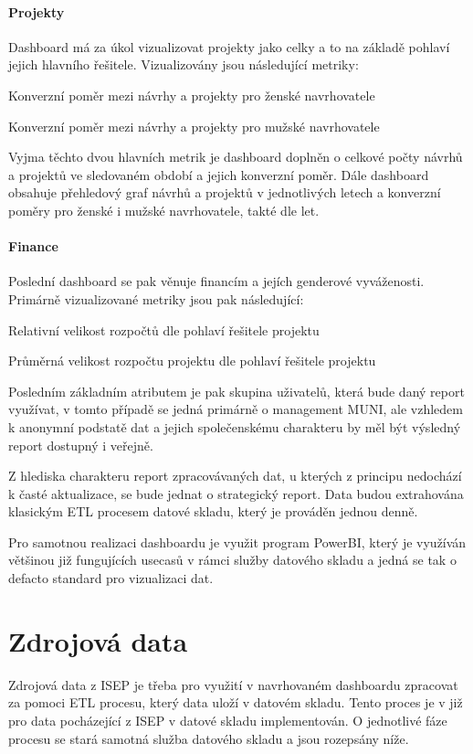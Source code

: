 \documentclass[
  digital,     %
  twoside,     %
  lof,         %
  lot,         %
]{fithesis4}
\begin{document}
\paragraph{Projekty} Dashboard má za úkol vizualizovat projekty jako celky a to na základě pohlaví jejich hlavního řešitele. Vizualizovány jsou následující metriky:
\begin{compactitem}
    \item Konverzní poměr mezi návrhy a projekty pro ženské navrhovatele
    \item Konverzní poměr mezi návrhy a projekty pro mužské navrhovatele
\end{compactitem}
Vyjma těchto dvou hlavních metrik je dashboard doplněn o celkové počty návrhů a projektů ve sledovaném období a jejich konverzní poměr. Dále dashboard obsahuje přehledový graf návrhů a projektů v jednotlivých letech a konverzní poměry pro ženské i mužské navrhovatele, takté dle let.

\paragraph{Finance} Poslední dashboard se pak věnuje financím a jejích genderové vyváženosti. Primárně vizualizované metriky jsou pak následující:
\begin{compactitem}
    \item Relativní velikost rozpočtů dle pohlaví řešitele projektu
    \item Průměrná velikost rozpočtu projektu dle pohlaví řešitele projektu
\end{compactitem}
\vspace{5}

Posledním základním atributem je pak skupina uživatelů, která bude daný report využívat, v tomto případě se jedná primárně o management MUNI, ale vzhledem k anonymní podstatě dat a jejich společenskému charakteru by měl být výsledný report dostupný i veřejně. 

Z hlediska charakteru report zpracovávaných dat, u kterých z principu nedochází k časté aktualizace, se bude jednat o strategický report. Data budou extrahována klasickým ETL procesem datové skladu, který je prováděn jednou denně. 

Pro samotnou realizaci dashboardu je využit program PowerBI, který je využíván většinou již fungujících usecasů v rámci služby datového skladu a jedná se tak o defacto standard pro vizualizaci dat.

\section{Zdrojová data}
Zdrojová data z ISEP je třeba pro využití v navrhovaném dashboardu zpracovat za pomoci ETL procesu, který data uloží v datovém skladu. Tento proces je v již pro data pocházející z ISEP v datové skladu implementován. O jednotlivé fáze procesu se stará samotná služba datového skladu a jsou rozepsány níže. 
\end{document}
